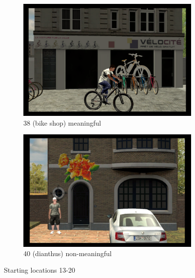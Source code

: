 \begin{figure}[!htb]
	\begin{subfigure}[b]{0.48\linewidth}
		\includegraphics[width=\linewidth]{figures/starting_locations_appx/38_S(bike shop)_A.PNG}
		\caption{38 (bike shop) meaningful}
		\label{fig:38_S(bike shop)_A}
	\end{subfigure}
	\begin{subfigure}[b]{0.48\linewidth}
		\includegraphics[width=\linewidth]{figures/starting_locations_appx/40_R(dianthus)_A.PNG}
		\caption{40 (dianthus) non-meaningful}
		\label{fig:40_R(dianthus)_A}
	\end{subfigure}
	
	\caption[Starting locations 13-20]{Starting locations 13-20}
	\label{fig:starting_locations_13-20}
\end{figure}

